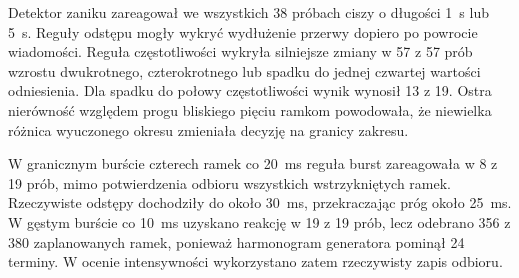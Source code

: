 Detektor zaniku zareagował we wszystkich 38 próbach ciszy o długości 1~s
lub 5~s. Reguły odstępu mogły wykryć wydłużenie przerwy dopiero po powrocie
wiadomości. Reguła częstotliwości wykryła silniejsze zmiany w 57 z 57 prób
wzrostu dwukrotnego, czterokrotnego lub spadku do jednej czwartej wartości
odniesienia. Dla spadku do połowy częstotliwości wynik wynosił 13 z 19.
Ostra nierówność względem progu bliskiego pięciu ramkom powodowała,
że niewielka różnica wyuczonego okresu zmieniała decyzję na granicy zakresu.

W granicznym burście czterech ramek co 20~ms reguła burst zareagowała
w 8 z 19 prób, mimo potwierdzenia odbioru wszystkich wstrzykniętych ramek.
Rzeczywiste odstępy dochodziły do około 30~ms, przekraczając próg około 25~ms.
W gęstym burście co 10~ms uzyskano reakcję w 19 z 19 prób, lecz odebrano
356 z 380 zaplanowanych ramek, ponieważ harmonogram generatora pominął
24 terminy. W ocenie intensywności wykorzystano zatem rzeczywisty zapis odbioru.

